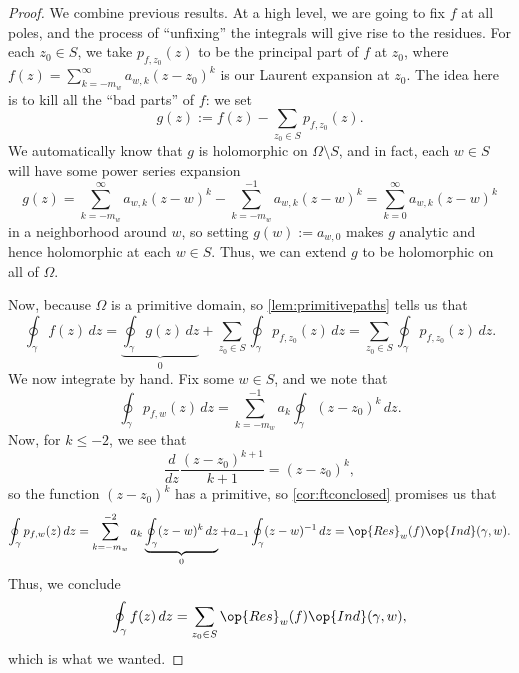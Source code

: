 \begin{proof}
	We combine previous results. At a high level, we are going to fix $f$ at all poles, and the process of ``unfixing'' the integrals will give rise to the residues. For each $z_0\in S$, we take $p_{f,z_0}(z)$ to be the principal part of $f$ at $z_0$, where
	$f(z)=\sum_{k=-m_w}^\infty a_{w,k}(z-z_0)^k$
	is our Laurent expansion at $z_0$. The idea here is to kill all the ``bad parts'' of $f$: we set
	\[g(z):=f(z)-\sum_{z_0\in S}p_{f,z_0}(z).\]
	We automatically know that $g$ is holomorphic on $\Omega\setminus S$, and in fact, each $w\in S$ will have some power series expansion
	\[g(z)=\sum_{k=-m_w}^\infty a_{w,k}(z-w)^k-\sum_{k=-m_w}^{-1}a_{w,k}(z-w)^k=\sum_{k=0}^\infty a_{w,k}(z-w)^k\]
	in a neighborhood around $w$, so setting $g(w):=a_{w,0}$ makes $g$ analytic and hence holomorphic at each $w\in S$. Thus, we can extend $g$ to be holomorphic on all of $\Omega$.

	Now, because $\Omega$ is a primitive domain, so \autoref{lem:primitivepaths} tells us that
	\[\oint_\gamma f(z)\,dz=\underbrace{\oint_\gamma g(z)\,dz}_0+\sum_{z_0\in S}\oint_\gamma p_{f,z_0}(z)\,dz=\sum_{z_0\in S}\oint_\gamma p_{f,z_0}(z)\,dz.\]
	We now integrate by hand. Fix some $w\in S$, and we note that
	\[\oint_\gamma p_{f,w}(z)\,dz=\sum_{k=-m_w}^{-1}a_k\oint_\gamma(z-z_0)^k\,dz.\]
	Now, for $k\le-2$, we see that
	\[\frac d{dz}\frac{(z-z_0)^{k+1}}{k+1}=(z-z_0)^k,\]
	so the function $(z-z_0)^k$ has a primitive, so \autoref{cor:ftconclosed} promises us that
	\[\oint_\gamma p_{f,w}(z)\,dz=\sum_{k=-m_w}^{-2}a_k\underbrace{\oint_\gamma(z-w)^k\,dz}_0+a_{-1}\oint_\gamma(z-w)^{-1}\,dz=\op{Res}_{w}(f)\op{Ind}(\gamma,w).\]
	Thus, we conclude
	\[\oint_\gamma f(z)\,dz=\sum_{z_0\in S}\op{Res}_{w}(f)\op{Ind}(\gamma,w),\]
	which is what we wanted.
\end{proof}

